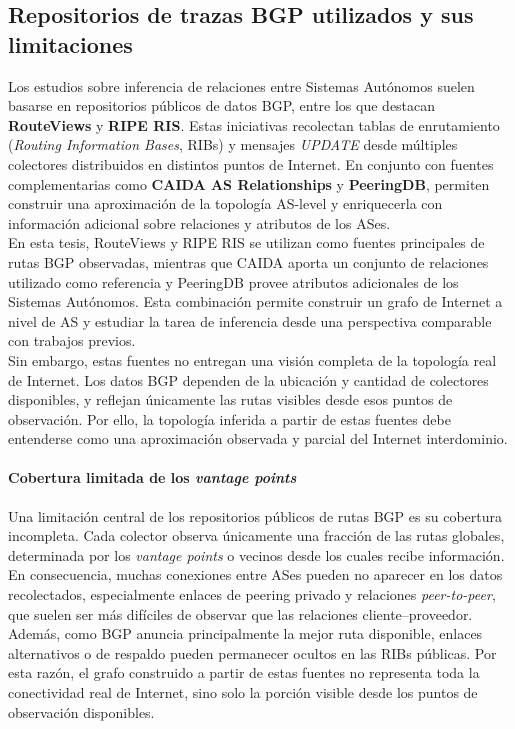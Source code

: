 \subsection{Repositorios de trazas BGP utilizados y sus limitaciones}

Los estudios sobre inferencia de relaciones entre Sistemas Autónomos suelen basarse en repositorios públicos de datos BGP, entre los que destacan \textbf{RouteViews} y \textbf{RIPE RIS}. Estas iniciativas recolectan tablas de enrutamiento (\textit{Routing Information Bases}, RIBs) y mensajes \textit{UPDATE} desde múltiples colectores distribuidos en distintos puntos de Internet. En conjunto con fuentes complementarias como \textbf{CAIDA AS Relationships} y \textbf{PeeringDB}, permiten construir una aproximación de la topología AS-level y enriquecerla con información adicional sobre relaciones y atributos de los ASes.\\

En esta tesis, RouteViews y RIPE RIS se utilizan como fuentes principales de rutas BGP observadas, mientras que CAIDA aporta un conjunto de relaciones utilizado como referencia y PeeringDB provee atributos adicionales de los Sistemas Autónomos. Esta combinación permite construir un grafo de Internet a nivel de AS y estudiar la tarea de inferencia desde una perspectiva comparable con trabajos previos.\\

Sin embargo, estas fuentes no entregan una visión completa de la topología real de Internet. Los datos BGP dependen de la ubicación y cantidad de colectores disponibles, y reflejan únicamente las rutas visibles desde esos puntos de observación. Por ello, la topología inferida a partir de estas fuentes debe entenderse como una aproximación observada y parcial del Internet interdominio.\\

\paragraph{Cobertura limitada de los \textit{vantage points}}
Una limitación central de los repositorios públicos de rutas BGP es su cobertura incompleta. Cada colector observa únicamente una fracción de las rutas globales, determinada por los \textit{vantage points} o vecinos desde los cuales recibe información. En consecuencia, muchas conexiones entre ASes pueden no aparecer en los datos recolectados, especialmente enlaces de peering privado y relaciones \textit{peer-to-peer}, que suelen ser más difíciles de observar que las relaciones cliente--proveedor. Además, como BGP anuncia principalmente la mejor ruta disponible, enlaces alternativos o de respaldo pueden permanecer ocultos en las RIBs públicas. Por esta razón, el grafo construido a partir de estas fuentes no representa toda la conectividad real de Internet, sino solo la porción visible desde los puntos de observación disponibles.\\


